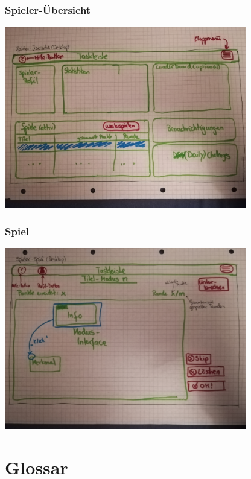 \documentclass[a4paper]{scrreprt}
\begin{document}
    \subsection{Spieler-Übersicht}
    \centering
    \includegraphics[width=400px]{../pictures/5_Spieler.jpg}
    \subsection{Spiel}
    \centering
    \includegraphics[width=400px]{../pictures/6_Spiel.jpg}
    \clearpage
    \chapter{Glossar}
    \printglossary[title=Glossar]
\end{document}
